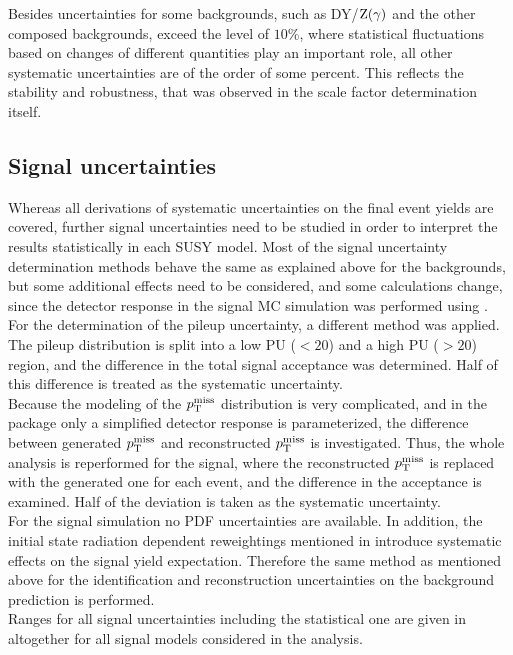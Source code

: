 Besides uncertainties for some backgrounds, such as DY/$\mathrm{Z}(\gamma)$ and the other composed backgrounds, exceed the level of $10\%$, where statistical fluctuations based on changes of different quantities play an important role, all other systematic uncertainties are of the order of some percent. This reflects the stability and robustness, that was observed in the scale factor determination itself.


\subsection{Signal uncertainties}
Whereas all derivations of systematic uncertainties on the final event yields are covered, further signal uncertainties need to be studied in order to interpret the results statistically in each SUSY model.
Most of the signal uncertainty determination methods behave the same as explained above for the backgrounds, but some additional effects need to be considered, and some calculations change, since the detector response in the signal MC simulation was performed using \FASTSIM.\\
For the determination of the pileup uncertainty, a different method was applied. The pileup distribution is split into a low PU ($<20$) and a high PU ($>20$) region, and the difference in the total signal acceptance was determined. Half of this difference is treated as the systematic uncertainty.\\
Because the modeling of the $p_{\mathrm{T}}^\text{miss}$ distribution is very complicated, and in the \FASTSIM package only a simplified detector response is parameterized, the difference between generated $p_{\mathrm{T}}^\text{miss}$ and reconstructed $p_{\mathrm{T}}^\text{miss}$ is investigated. Thus, the whole analysis is reperformed for the signal, where the reconstructed $p_{\mathrm{T}}^\text{miss}$ is replaced with the generated one for each event, and the difference in the acceptance is examined. Half of the deviation is taken as the systematic uncertainty.\\
For the signal simulation no PDF uncertainties are available. In addition, the initial state radiation dependent reweightings mentioned in  introduce systematic effects on the signal yield expectation. Therefore the same method as mentioned above for the identification and reconstruction uncertainties on the background prediction is performed.\\
Ranges for all signal uncertainties including the statistical one are given in  altogether for all signal models considered in the analysis.
